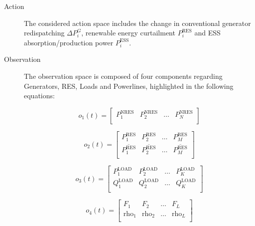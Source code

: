 \begin{description}
	\item[Action] The considered action space includes the change in conventional generator redispatching $\Delta P^G_i$, renewable energy curtailment $P^\text{RES}_i$ and \ac{ESS} absorption/production power $P^\text{ESS}_i$.
	
	\item[Observation] The observation space is composed of four components regarding Generators, \ac{RES}, Loads and Powerlines, highlighted in the following equations:
	

	
	\begin{equation} \label{eq:simple-obs-space1}
		o_{1}(t)= \begin{bmatrix}
			P^\text{NRES}_1 & P^\text{NRES}_2 & \dots & P^\text{NRES}_{N} \\
		\end{bmatrix}
	\end{equation}
	
	\begin{equation} \label{eq:simple-obs-space2}
		o_{2}(t)= \begin{bmatrix}
			P^\text{RES}_1 & P^\text{RES}_2 & \dots & P^\text{RES}_{M} \\
			\overline{P^\text{RES}_1} & \overline{P^\text{RES}_2} & \dots & \overline{P^\text{RES}_{M}} \\
		\end{bmatrix}
	\end{equation}
	
	\begin{equation} \label{eq:simple-obs-space3}
		o_{3}(t)= \begin{bmatrix}
			P^\text{LOAD}_1 & P^\text{LOAD}_2 & \dots & P^\text{LOAD}_{K} \\
			Q^\text{LOAD}_1 & Q^\text{LOAD}_2 & \dots & Q^\text{LOAD}_{K} \\
		\end{bmatrix}
	\end{equation}
	
	\begin{equation} \label{eq:simple-obs-space4}
		o_{4}(t)= \begin{bmatrix}
			F_1 & F_2 & \dots & F_{L} \\
			\text{rho}_1 & \text{rho}_2 & \dots & \text{rho}_{L} \\
		\end{bmatrix}
	\end{equation}
	

\end{description}
